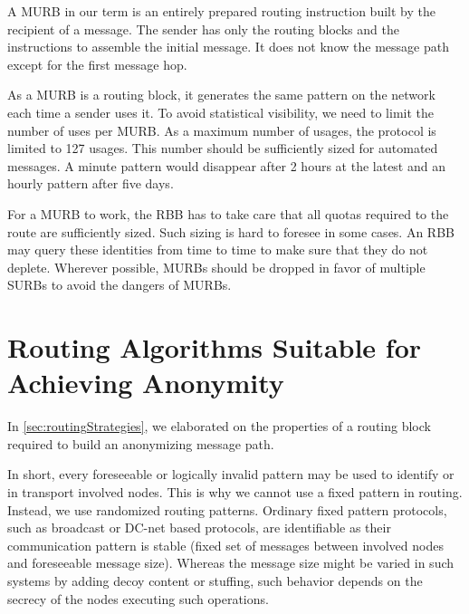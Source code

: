 A MURB in our term is an entirely prepared routing instruction built by the recipient of a message. The sender has only the routing blocks and the instructions to assemble the initial message. It does not know the message path except for the first message hop.

As a MURB is a routing block, it generates the same pattern on the network each time a sender uses it. To avoid statistical visibility, we need to limit the number of uses per MURB. As a maximum number of usages, the protocol is limited to 127 usages. This number should be sufficiently sized for automated messages. A minute pattern would disappear after 2 hours at the latest and an hourly pattern after five days.

For a MURB to work, the RBB has to take care that all quotas required to the route are sufficiently sized. Such sizing is hard to foresee in some cases. An RBB may query these identities from time to time to make sure that they do not deplete. Wherever possible, MURBs should be dropped in favor of multiple SURBs to avoid the dangers of MURBs.

\section{Routing Algorithms Suitable for Achieving Anonymity\label{sec:routingAlgorithm}}
In \cref{sec:routingStrategies}, we elaborated on the properties of a routing block required to build an anonymizing message path.

In short, every foreseeable or logically invalid pattern may be used to identify \VortexMessages{} or in transport involved nodes. This is why we cannot use a fixed pattern in routing. Instead, we use randomized routing patterns. Ordinary fixed pattern protocols, such as broadcast or DC-net based protocols, are identifiable as their communication pattern is stable (fixed set of messages between involved nodes and foreseeable message size). Whereas the message size might be varied in such systems by adding decoy content or stuffing, such behavior depends on the secrecy of the nodes executing such operations.


